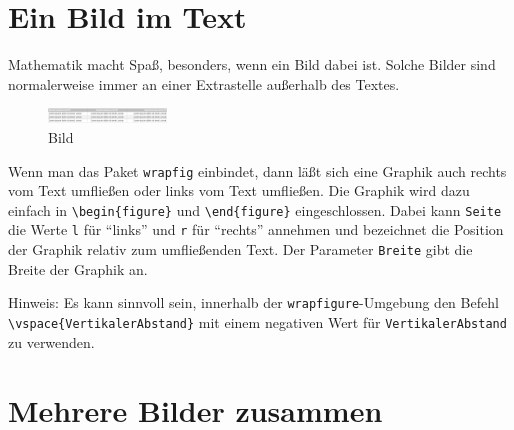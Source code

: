 \documentclass[a0paper,noDIN,Mathematik]{tudmathposter}
\begin{document}
\section{Ein Bild im Text}
\begin{multicols}{2}
Mathematik macht Spaß, besonders, wenn ein Bild dabei ist. Solche Bilder sind normalerweise immer an einer Extrastelle außerhalb des Textes.   \begin{figure}
    \begin{center}
      \includegraphics[width=0.28\textwidth]{image1}
    \end{center}
    \caption{Bild}
  \end{figure}
Wenn man das Paket \verb+wrapfig+ einbindet, dann läßt sich eine Graphik auch rechts vom Text umfließen oder links vom Text umfließen. Die Graphik wird dazu einfach in \verb+\begin{figure}+ und \verb+\end{figure}+ eingeschlossen. Dabei kann \verb+Seite+ die Werte  \texttt{l} 
für ``links'' und \texttt{r} für ``rechts'' annehmen und bezeichnet die Position der Graphik relativ zum umfließenden Text. Der Parameter \texttt{Breite} gibt die Breite der Graphik an.\par 

Hinweis: Es kann sinnvoll sein, innerhalb der \texttt{wrapfigure}-Umgebung den Befehl \verb+\vspace{VertikalerAbstand}+ mit einem negativen Wert für 
\texttt{VertikalerAbstand} zu verwenden.
\end{multicols}

\section{Mehrere Bilder zusammen}
\end{document}

